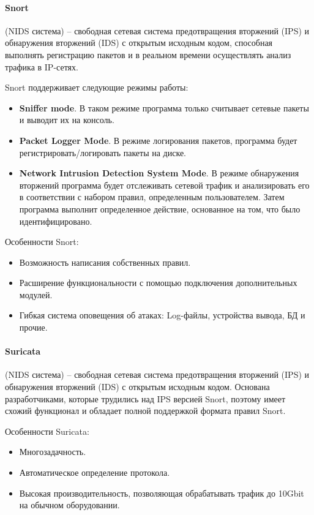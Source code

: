 \paragraph*{Snort} (NIDS система) -- свободная сетевая система предотвращения вторжений (IPS) 
и обнаружения вторжений (IDS) с открытым исходным кодом, способная выполнять регистрацию 
пакетов и в реальном времени осуществлять анализ трафика в IP-сетях. 

Snort поддерживает следующие режимы работы:
\begin{itemize}
	\item \textbf{Sniffer mode}. В таком режиме программа только считывает сетевые пакеты и 
	выводит их на консоль. 

	\item \textbf{Packet Logger Mode}. В режиме логирования пакетов, программа будет 
	регистрировать/логировать пакеты на диске.

	\item \textbf{Network Intrusion Detection System Mode}. В режиме обнаружения вторжений 
	программа будет отслеживать сетевой трафик и анализировать его в соответствии с набором 
	правил, определенным пользователем. Затем программа выполнит определенное действие, 
	основанное на том, что было идентифицировано.
\end{itemize}

Особенности Snort:
\begin{itemize}
	\item Возможность написания собственных правил.
	\item Расширение функциональности с помощью подключения дополнительных модулей.
	\item Гибкая система оповещения об атаках: Log-файлы, устройства вывода, БД и прочие.
\end{itemize}


\paragraph*{Suricata} (NIDS система) -- свободная сетевая система предотвращения вторжений 
(IPS) и обнаружения вторжений (IDS) с открытым исходным кодом. Основана разработчиками, 
которые трудились над IPS версией Snort, поэтому имеет схожий функционал и обладает полной 
поддержкой формата правил Snort.

Особенности Suricata:
\begin{itemize}
	\item Многозадачность.
	
	\item Автоматическое определение протокола.
	
	\item Высокая производительность, позволяющая обрабатывать трафик до 10Gbit на обычном 
	оборудовании.
\end{itemize}


